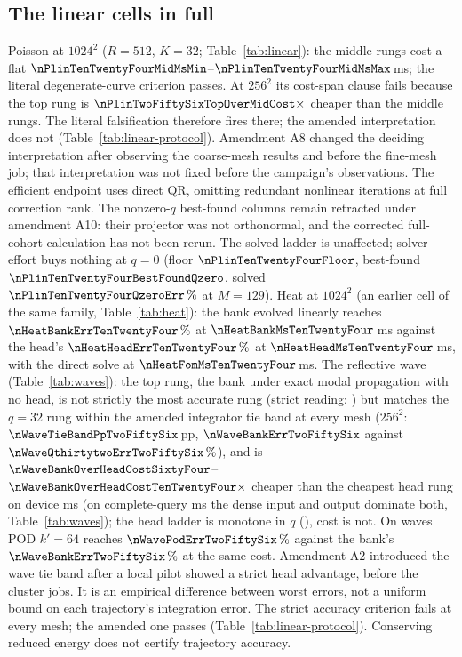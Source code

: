 \subsection{The linear cells in full}
\label{app:extended:linear}
Poisson at $1024^2$ ($R=512$, $K=32$; Table~\ref{tab:linear}): the middle
rungs cost a flat
$\nPlinTenTwentyFourMidMsMin$--$\nPlinTenTwentyFourMidMsMax$\,ms; the
literal degenerate-curve criterion passes. At $256^2$ its cost-span
clause fails because the top rung is
$\nPlinTwoFiftySixTopOverMidCost\times$ cheaper than the middle rungs.
The literal falsification therefore fires there; the amended
interpretation does not (Table~\ref{tab:linear-protocol}). Amendment A8
changed the deciding interpretation after observing the coarse-mesh
results and before the fine-mesh job; that interpretation was not fixed
before the campaign's observations. The efficient endpoint uses direct
QR, omitting redundant nonlinear iterations at full correction rank.
The nonzero-$q$ best-found columns remain retracted under amendment A10:
their projector was not orthonormal, and the corrected full-cohort
calculation has not been rerun. The solved ladder is unaffected;
solver effort buys nothing at $q=0$ (floor $\nPlinTenTwentyFourFloor$,
best-found $\nPlinTenTwentyFourBestFoundQzero$, solved
$\nPlinTenTwentyFourQzeroErr\,\%$ at $M=129$). Heat at $1024^2$ (an
earlier cell of the same family, Table~\ref{tab:heat}): the bank evolved
linearly reaches $\nHeatBankErrTenTwentyFour\,\%$ at
$\nHeatBankMsTenTwentyFour$\,ms against the head's
$\nHeatHeadErrTenTwentyFour\,\%$ at $\nHeatHeadMsTenTwentyFour$\,ms, with
the direct solve at $\nHeatFomMsTenTwentyFour$\,ms. The reflective wave
(Table~\ref{tab:waves}): the top rung, the bank under exact modal
propagation with no head, is not strictly the most accurate rung (strict
reading: \nWaveTopStrictBestTwoFiftySix{}) but matches the $q=32$ rung
within the amended integrator tie band at every mesh ($256^2$:
$\nWaveTieBandPpTwoFiftySix$\,pp,
$\nWaveBankErrTwoFiftySix$ against $\nWaveQthirtytwoErrTwoFiftySix\,\%$),
and is
$\nWaveBankOverHeadCostSixtyFour$--$\nWaveBankOverHeadCostTenTwentyFour\times$
cheaper than the cheapest head rung on device ms (on complete-query ms
the dense input and output dominate both, Table~\ref{tab:waves}); the head ladder is monotone in $q$
(\nWaveHeadLadderMonotoneTwoFiftySix{}), cost is not. On waves POD $k'=64$
reaches $\nWavePodErrTwoFiftySix\,\%$ against the bank's
$\nWaveBankErrTwoFiftySix\,\%$ at the same cost. Amendment A2 introduced
the wave tie band after a local pilot showed a strict head advantage,
before the cluster jobs. It is an empirical difference between worst
errors, not a uniform bound on each trajectory's integration error.
The strict accuracy criterion fails at every mesh; the amended one
passes (Table~\ref{tab:linear-protocol}). Conserving reduced energy does
not certify trajectory accuracy.

